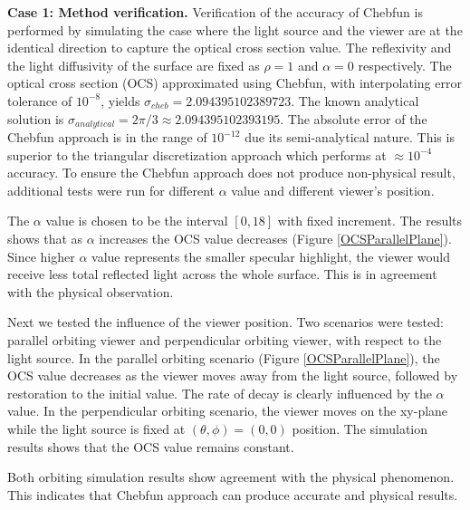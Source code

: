 \documentclass[11pt]{amsart}
\theoremstyle{definition}
\begin{document}
{\bf Case 1: Method verification.} Verification of the accuracy of Chebfun is performed by simulating the case where the light source and the viewer are at the identical direction to capture the optical cross section value. The reflexivity and the light diffusivity of the surface are fixed as $\rho = 1$ and $\alpha =0$ respectively. The optical cross section (OCS) approximated using Chebfun, with interpolating error tolerance of $10^{-8}$, yields $\sigma_{cheb} = 2.094395102389723$. The known analytical solution is $\sigma_{analytical} = 2\pi/3 \approx 2.094395102393195$. The absolute error of the Chebfun approach is in the range of $10^{-12}$ due its semi-analytical nature. This is superior to the triangular discretization approach which performs at $\approx 10^{-4}$ accuracy. To ensure the Chebfun approach does not produce non-physical result, additional tests were run for different $\alpha$ value and different viewer's position.

The $\alpha$ value is chosen to be the interval $[0,18]$ with fixed increment. The results shows that as $\alpha$ increases the OCS value decreases (Figure \ref{OCSParallelPlane}). Since higher $\alpha$ value represents the smaller specular highlight, the viewer would receive less total reflected light across the whole surface. This is in agreement with the physical observation.

Next we tested the influence of the viewer position. Two scenarios were tested: parallel orbiting viewer and perpendicular orbiting viewer, with respect to the light source. In the parallel orbiting scenario (Figure \ref{OCSParallelPlane}), the OCS value decreases as the viewer moves away from the light source, followed by restoration to the initial value. The rate of decay is clearly influenced by the $\alpha$ value. In the perpendicular orbiting scenario, the viewer moves on the xy-plane while the light source is fixed at $(\theta, \phi) = (0,0)$ position. The simulation results shows that the OCS value remains constant.

Both orbiting simulation results show agreement with the physical phenomenon. This indicates that Chebfun approach can produce accurate and physical results.
\end{document}
